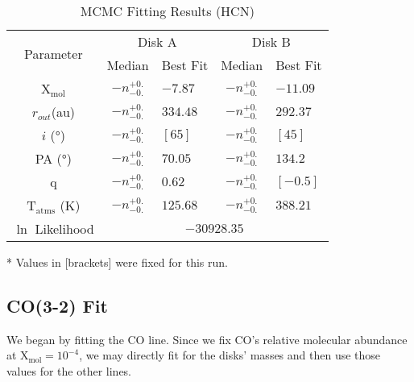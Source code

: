 \begin{table}
  \begin{threeparttable}
    \centering
    \caption{MCMC Fitting Results (HCN)}
    \label{table:fit_hcn}
    \renewcommand{\arraystretch}{1.2}
    \begin{tabular}{c c l c l }
      \toprule \toprule
      \multirow{2}{*}{Parameter} & \multicolumn{2}{c}{Disk A} & \multicolumn{2}{c}{Disk B} \\
                                 & Median & Best Fit          & Median & Best Fit \\
      \midrule %
      X$_\text{mol}$             & $ -n _{-0.} ^{+0.}$ & $-7.87$    & $ -n _{-0.} ^{+0.}$ & $-11.09$ \\
      $r_{out}$(\si{au})        & $ -n _{-0.} ^{+0.}$ & $334.48$    & $ -n _{-0.} ^{+0.}$  & $292.37$    \\
      $i$ (\si{\degree})        & $ -n _{-0.} ^{+0.}$ & $[65]$   & $ -n _{-0.} ^{+0.}$ & $[45]$    \\
      PA  (\si{\degree})        & $ -n _{-0.} ^{+0.}$ & $70.05$  & $ -n _{-0.} ^{+0.}$  & $134.2$  \\
      q                         & $ -n _{-0.} ^{+0.}$ & $0.62$  & $ -n _{-0.} ^{+0.}$  & $[-0.5]$  \\
      T$_\text{atms}$ (\si{\K}) & $ -n _{-0.} ^{+0.}$ & $125.68 $  & $ -n _{-0.} ^{+0.}$  & $388.21$  \\
      $\ln$ Likelihood          & \multicolumn{4}{c}{$-30928.35$} \\
      \bottomrule
    \end{tabular}
    \begin{tablenotes}\footnotesize
      \item[*] Values in [brackets] were fixed for this run.
    \end{tablenotes}
  \end{threeparttable}
\end{table}





\subsection{CO(3-2) Fit}
We began by fitting the CO line. Since we fix CO's relative molecular abundance at X$_\text{mol}=10^{-4}$, we may directly fit for the disks' masses and then use those values for the other lines.

